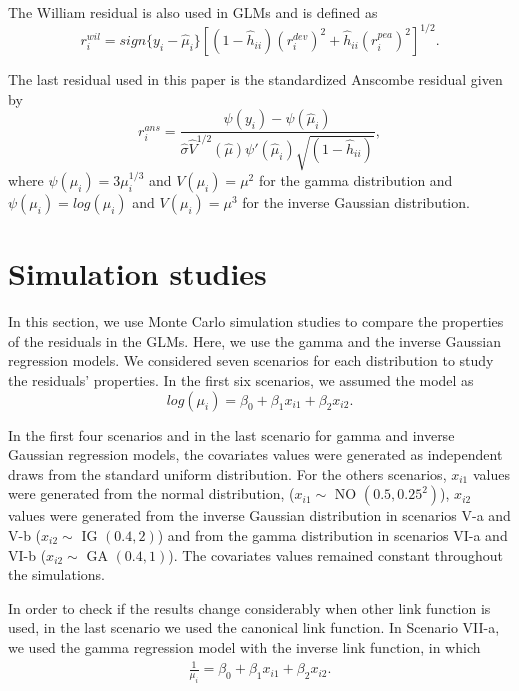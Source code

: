 \documentclass[11pt,authoryear,review,3p,times]{elsarticle}
\begin{document}
 
The William residual is also used in GLMs and is defined as
	\begin{equation}
	r_{i}^{wil}=sign\{y_i-\hat{\mu}_i\}[(1-\hat{h}_{ii})(r_i^{dev})^2+\hat{h}_{ii}(r_i^{pea})^2]^{1/2}.
	\end{equation}

The last residual used in this paper is the standardized Anscombe residual given by
\begin{equation}
r_i^{ans}=\frac{\psi(y_i)-\psi(\hat{\mu}_i)}{\hat{\sigma}\hat{V}^{1/2}(\hat{\mu})\psi'(\hat{\mu}_i)\sqrt{(1-\hat{h}_{ii})}},
\end{equation}
where $\psi(\mu_i)=3\mu_i^{1/3}$ and $V(\mu_i)=\mu^2$ for the gamma distribution and $\psi(\mu_i)=log(\mu_i)$ and $V(\mu_i)=\mu^3$ for the inverse Gaussian distribution.
 
\section{Simulation studies}\label{simu}
In this section, we use Monte Carlo simulation studies to compare the properties of the residuals in the GLMs. 
Here, we use the gamma and the inverse Gaussian regression models.
We considered seven scenarios for each distribution to study the residuals' properties.
In the first six scenarios, we assumed the model as
\begin{equation*}
	log(\mu_i)=\beta_{0}+\beta_{1}x_{i1}+\beta_{2}x_{i2}.
\end{equation*}

In the first four scenarios and in the last scenario for gamma and inverse Gaussian regression models, the covariates values were generated as independent draws from the standard uniform distribution. 
For the others scenarios, $x_{i1}$ values were generated from the normal distribution, ($x_{i1}\sim$ NO $(0.5,0.25^2)$), $x_{i2}$ values were generated from the inverse Gaussian distribution in scenarios V-a and V-b ($x_{i2}\sim $ IG $ (0.4,2)$) and from the gamma distribution in scenarios VI-a and VI-b ($x_{i2}\sim $ GA $ (0.4,1)$). 
The covariates values remained constant throughout the simulations. 

In order to check if the results change considerably when other link function is used, in the last scenario we used the canonical link function. 
In Scenario VII-a, we used the gamma regression model with the inverse link function, in which
\begin{eqnarray*}
\frac{1}{\mu_i} = \beta_{0}+\beta_{1}x_{i1}+\beta_{2}x_{i2}.
\end{eqnarray*}
\end{document}
